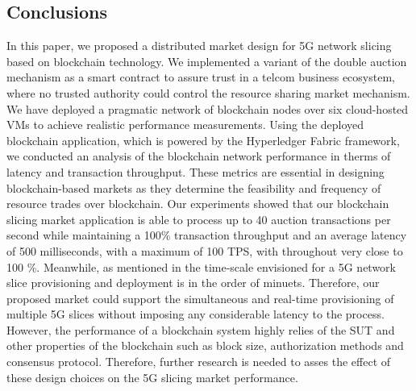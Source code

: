 \subsection{Conclusions}
\label{sec:Conclusions}
In this paper, we proposed a distributed market design for \ac{5G} network slicing based on blockchain technology. We implemented a variant of the double auction mechanism as a smart contract to assure trust in a telcom business ecosystem, where no trusted authority could control the resource sharing market mechanism. We have deployed a pragmatic network of blockchain nodes over six cloud-hosted \acp{VM} to achieve realistic performance measurements. Using the deployed blockchain application, which is powered by the Hyperledger Fabric framework, we conducted an analysis of the blockchain network performance in therms of latency and transaction throughput. These metrics are essential in designing blockchain-based markets as they determine the feasibility and frequency of resource trades over blockchain. Our experiments showed that our blockchain slicing market application is able to process up to 40 auction transactions per second while maintaining a 100\% transaction throughput and an average latency of 500 milliseconds, with a maximum of 100 TPS, with throughout very close to 100 \%.
Meanwhile, as mentioned in \cite{valcarenghireliable} the time-scale envisioned for a \ac{5G} network slice provisioning and deployment is in the order of minuets. Therefore, our proposed market could support the simultaneous and real-time provisioning of multiple \ac{5G} slices without imposing any considerable latency to the process. However, the performance of a blockchain system highly relies of the \ac{SUT} and other properties of the blockchain such as block size, authorization methods and consensus protocol. Therefore, further research is needed to asses the effect of these design choices on the \ac{5G} slicing market performance.


